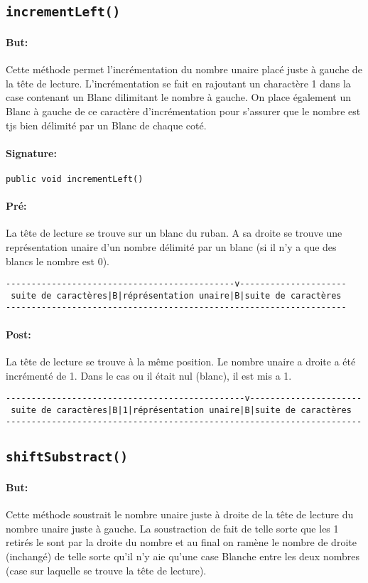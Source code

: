 \documentclass[a4paper,11pt]{article}
\begin{document}
\subsection{\texttt{incrementLeft()}}
\paragraph{But:} Cette méthode permet l'incrémentation du nombre unaire placé juste à gauche de la tête de lecture. L'incrémentation se fait en rajoutant un charactère 1 dans la case contenant un Blanc dilimitant le nombre à gauche. On place également un Blanc à gauche de ce caractère d'incrémentation pour s'assurer que le nombre est tjs bien délimité par un Blanc de chaque coté.
\paragraph{Signature:} \texttt{public void incrementLeft()}
\paragraph{Pré:} 
La tête de lecture se trouve sur un blanc du ruban. A sa droite se trouve une représentation unaire d'un nombre délimité par un blanc (si il n'y a que des blancs le nombre est 0).
\begin{verbatim}
---------------------------------------------v---------------------
 suite de caractères|B|réprésentation unaire|B|suite de caractères
-------------------------------------------------------------------
\end{verbatim}
\paragraph{Post:}
La tête de lecture se trouve à la même position. Le nombre unaire a droite a été incrémenté de 1. Dans le cas ou il était nul (blanc), il est mis a 1.
\begin{verbatim}
-----------------------------------------------v----------------------
 suite de caractères|B|1|réprésentation unaire|B|suite de caractères
----------------------------------------------------------------------
\end{verbatim}
\subsection{\texttt{shiftSubstract()}}
\paragraph{But:} Cette méthode soustrait le nombre unaire juste à droite de la tête de lecture du nombre unaire juste à gauche. La soustraction de fait de telle sorte que les 1 retirés le sont par la droite du nombre et au final on ramène le nombre de droite (inchangé) de telle sorte qu'il n'y aie qu'une case Blanche entre les deux nombres (case sur laquelle se trouve la tête de lecture).
\end{document}
